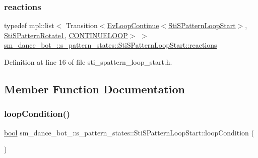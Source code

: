 \subsubsection{\texorpdfstring{reactions}{reactions}}
{\footnotesize\ttfamily typedef mpl\+::list$<$ Transition$<$\hyperlink{structsmacc_1_1default__events_1_1EvLoopContinue}{Ev\+Loop\+Continue}$<$\hyperlink{structsm__dance__bot__2_1_1s__pattern__states_1_1StiSPatternLoopStart}{Sti\+S\+Pattern\+Loop\+Start}$>$, \hyperlink{structsm__dance__bot__2_1_1s__pattern__states_1_1StiSPatternRotate1}{Sti\+S\+Pattern\+Rotate1}, \hyperlink{structsmacc_1_1default__transition__tags_1_1CONTINUELOOP}{C\+O\+N\+T\+I\+N\+U\+E\+L\+O\+OP}$>$ $>$ \hyperlink{structsm__dance__bot__2_1_1s__pattern__states_1_1StiSPatternLoopStart_a4d68e23acfe5431bdc2c450aef851e6e}{sm\+\_\+dance\+\_\+bot\+\_\+::s\+\_\+pattern\+\_\+states\+::\+Sti\+S\+Pattern\+Loop\+Start\+::reactions}}



Definition at line 16 of file sti\+\_\+spattern\+\_\+loop\+\_\+start.\+h.



\subsection{Member Function Documentation}
\mbox{\label{structsm__dance__bot__2_1_1s__pattern__states_1_1StiSPatternLoopStart_afc9d41599d4ac143e063d19d647480dd}} 
\subsubsection{\texorpdfstring{loop\+Condition()}{loopCondition()}}
{\footnotesize\ttfamily \hyperlink{classbool}{bool} sm\+\_\+dance\+\_\+bot\+\_\+::s\+\_\+pattern\+\_\+states\+::\+Sti\+S\+Pattern\+Loop\+Start\+::loop\+Condition (\begin{DoxyParamCaption}{ }\end{DoxyParamCaption})\hspace{0.3cm}{\ttfamily [inline]}}



